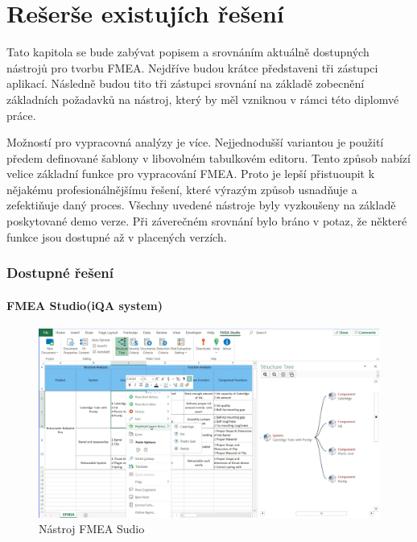 \chapter{Rešerše existujích řešení}
\label{sec:nastroje}
Tato kapitola se bude zabývat popisem a srovnáním aktuálně dostupných nástrojů pro tvorbu FMEA. Nejdříve budou krátce představeni tři zástupci aplikací. Následně budou tito tři zástupci srovnání na základě zobecnění základních požadavků na nástroj, který by měl vzniknou v rámci této diplomvé práce. 

Možností pro vypracovná analýzy je více. Nejjednodušší variantou je použití předem definované šablony v libovolném tabulkovém editoru. Tento způsob nabízí velice základní funkce pro vypracování FMEA. Proto je lepší přistuoupit k nějakému profesionálnějšímu řešení, které výrazým způsob usnadňuje a zefektiňuje daný proces. Všechny uvedené nástroje byly vyzkoušeny na základě poskytované demo verze. Při záverečném srovnání bylo bráno v potaz, že některé funkce jsou dostupné až v placených verzích.

\subsection{Dostupné řešení}
\subsubsection{FMEA Studio(iQA system)}

\begin{figure}[h]
\centering
	\includegraphics[width=1.0\textwidth]{Figures/iqa.PNG}
	\caption{Nástroj FMEA Sudio }
	\label{fig:iqa}
\end{figure}


